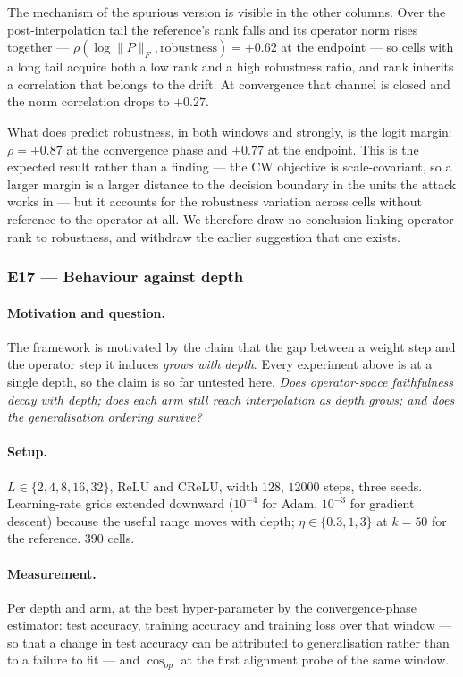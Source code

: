 \documentclass{article} %
\theoremstyle{plain}
\theoremstyle{definition}
\theoremstyle{remark}
\begin{document}
The mechanism of the spurious version is visible in the other columns. Over the post-interpolation
tail the reference's rank falls and its operator norm rises together --- $\rho(\log\|P\|_F,
\text{robustness}) = +0.62$ at the endpoint --- so cells with a long tail acquire both a low rank
and a high robustness ratio, and rank inherits a correlation that belongs to the drift. At
convergence that channel is closed and the norm correlation drops to $+0.27$.

What does predict robustness, in both windows and strongly, is the logit margin:
$\rho = +0.87$ at the convergence phase and $+0.77$ at the endpoint. This is the expected result
rather than a finding --- the CW objective is scale-covariant, so a larger margin is a larger
distance to the decision boundary in the units the attack works in --- but it accounts for the
robustness variation across cells without reference to the operator at all. We therefore draw no
conclusion linking operator rank to robustness, and withdraw the earlier suggestion that one
exists.

\subsubsection{E17 --- Behaviour against depth}
\label{sec:e17}

\paragraph{Motivation and question.}
The framework is motivated by the claim that the gap between a weight step and the operator step it
induces \emph{grows with depth}. Every experiment above is at a single depth, so the claim is so far
untested here. \emph{Does operator-space faithfulness decay with depth; does each arm still reach
interpolation as depth grows; and does the generalisation ordering survive?}

\paragraph{Setup.}
$L \in \{2, 4, 8, 16, 32\}$, ReLU and CReLU, width $128$, $12000$ steps, three seeds. Learning-rate
grids extended downward ($10^{-4}$ for Adam, $10^{-3}$ for gradient descent) because the useful
range moves with depth; $\eta \in \{0.3, 1, 3\}$ at $k = 50$ for the reference. $390$ cells.

\paragraph{Measurement.}
Per depth and arm, at the best hyper-parameter by the convergence-phase estimator: test accuracy,
training accuracy and training loss over that window --- so that a change in test accuracy can be
attributed to generalisation rather than to a failure to fit --- and $\cos_{op}$ at the first
alignment probe of the same window.
\end{document}
